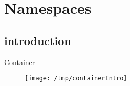 \section{Namespaces}
\subsection{introduction}
\begin{frame}{Container}{~}
    \begin{figure}
        \center
            \texttt{[image: /tmp/containerIntro]}
        
    \end{figure}

\end{frame}